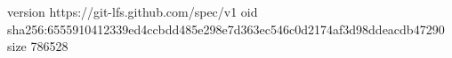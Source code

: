 version https://git-lfs.github.com/spec/v1
oid sha256:6555910412339ed4ccbdd485e298e7d363ec546c0d2174af3d98ddeacdb47290
size 786528
